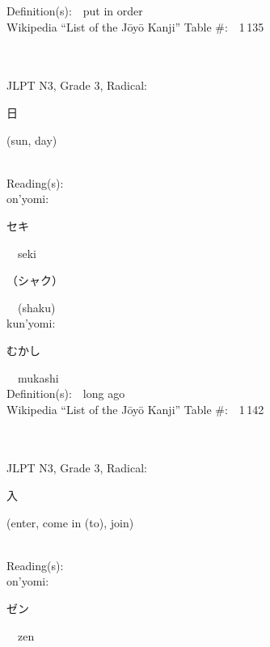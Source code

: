 \begin{multicols}{2}
Definition(s):\ \ put in order \\
Wikipedia ``List of the J\=oy\=o Kanji'' Table \#:\ \ 1\,135 \\
\ \ \\
{\fontsize{34pt}{40pt}  }\ \ \\  %
{JLPT N3, Grade 3, Radical:\ \ {\begin{CJK}{UTF8}{min} 日 \end{CJK}} (sun, day) } \\
Reading(s):\ \ \\
{\hspace*{1em}}on'yomi:\ \ \\
{\hspace*{2em}}{\begin{CJK}{UTF8}{min} セキ \end{CJK}}\ \ seki\ \ \\
{\hspace*{2em}}{\begin{CJK}{UTF8}{min} （シャク） \end{CJK}}\ \ (shaku)\ \ \\
{\hspace*{1em}}kun'yomi:\ \ \\
{\hspace*{2em}}{\begin{CJK}{UTF8}{min} むかし \end{CJK}}\ \ mukashi\ \ \\
Definition(s):\ \ long ago \\
Wikipedia ``List of the J\=oy\=o Kanji'' Table \#:\ \ 1\,142 \\
\ \ \\
{\fontsize{34pt}{40pt}  }\ \ \\  %
{JLPT N3, Grade 3, Radical:\ \ {\begin{CJK}{UTF8}{min} 入 \end{CJK}} (enter, come in (to), join) } \\
Reading(s):\ \ \\
{\hspace*{1em}}on'yomi:\ \ \\
{\hspace*{2em}}{\begin{CJK}{UTF8}{min} ゼン \end{CJK}}\ \ zen\ \ \\

\end{multicols}
